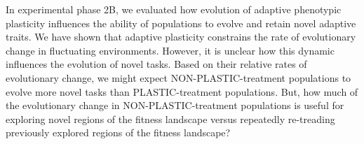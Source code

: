




In experimental phase 2B, we evaluated how evolution of adaptive phenotypic plasticity influences the ability of populations to evolve and retain novel adaptive traits.
We have shown that adaptive plasticity constrains the rate of evolutionary change in fluctuating environments.
However, it is unclear how this dynamic influences the evolution of novel tasks.
Based on their relative rates of evolutionary change, we might expect NON-PLASTIC-treatment populations to evolve more novel tasks than PLASTIC-treatment populations.
But, how much of the evolutionary change in NON-PLASTIC-treatment populations is useful for exploring novel regions of the fitness landscape versus repeatedly re-treading previously explored regions of the fitness landscape?


